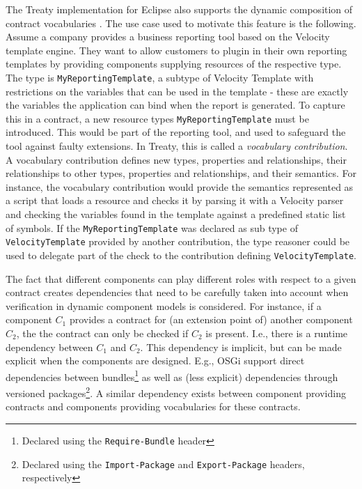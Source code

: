 \documentclass{llncs}
\begin{document}
The Treaty implementation for Eclipse also supports the dynamic composition of contract vocabularies \cite{Treaty.JOT2009}. The use case used to motivate this feature is the following. Assume a company provides a business reporting tool based on the Velocity template engine. They want to allow customers to plugin in their own reporting templates by providing components supplying resources of the respective type. The type is \texttt{MyReportingTemplate}, a subtype of Velocity Template with restrictions on the variables that can be used in the template - these are exactly the variables the application can bind when the report is generated. To capture this  in a contract, a new resource types \texttt{MyReportingTemplate} must be introduced. This would be part of the reporting tool, and used to safeguard the tool against faulty extensions.  In Treaty, this is called a \textit{vocabulary contribution}. A vocabulary contribution defines new types, properties and relationships, their relationships to other types, properties and relationships, and their semantics. For instance, the vocabulary contribution would provide the semantics represented as a script that loads a resource and checks it by parsing it with a Velocity parser and checking the variables found in the template against a predefined static list of symbols. If the \texttt{MyReportingTemplate} was declared as sub type of \texttt{VelocityTemplate} provided by another contribution, the type reasoner could be used to delegate part of the check to the contribution defining \texttt{VelocityTemplate}. 

The fact that different components can play different roles with respect to a given contract creates dependencies that need to be carefully taken into account when verification in dynamic component models is considered. For instance, if a component $C_1$ provides a contract for (an extension point of) another component $C_2$, the the contract  can only be checked if $C_2$ is present. I.e., there is a runtime dependency between $C_1$ and $C_2$. This dependency is implicit,
but can be made explicit when the components are designed. E.g., OSGi support direct dependencies between bundles\footnote{Declared using the \texttt{Require-Bundle} header} as well as (less explicit) dependencies through versioned packages\footnote{Declared using the \texttt{Import-Package} and \texttt{Export-Package} headers, respectively}. A similar dependency exists between component providing contracts and components providing vocabularies for these contracts. 
 
\end{document}
